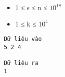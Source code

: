 \begin{itemize}
	\item     1 ≤ s ≤ n ≤ $10^{18}$
	\item     1 ≤ k ≤ $10^{4}$
\end{itemize}
\begin{verbatim}
Dữ liệu vào
5 2 4

Dữ liệu ra
1
\end{verbatim}